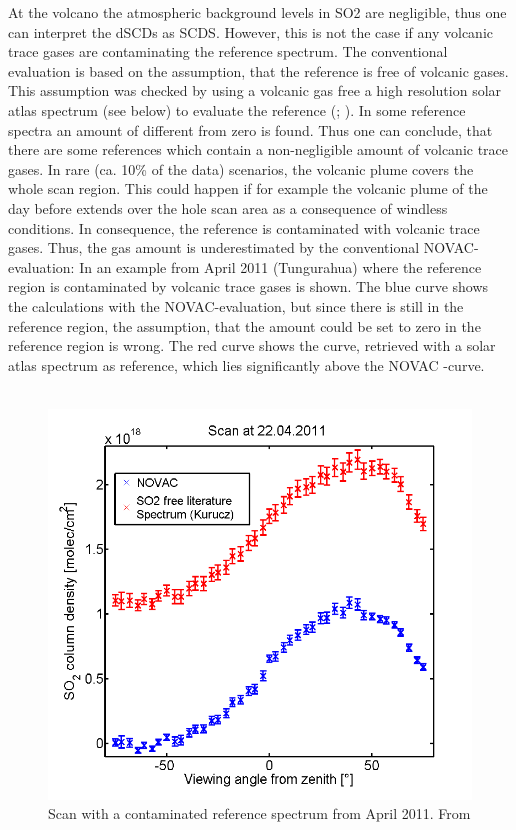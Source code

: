 At the volcano the atmospheric background levels in SO2 are negligible, thus one can interpret the dSCDs as SCDS. However, this is not the case if any volcanic trace gases are contaminating the reference spectrum.
The conventional evaluation is based on the assumption, that the reference is free of volcanic gases. This assumption was checked by using a volcanic gas free a high resolution solar atlas spectrum (see below) to evaluate the reference (\cite{lubcke2014optical}; \cite{salerno2009novel}). In some reference spectra an amount of   different from zero is found. Thus one can conclude, that there are some references which contain a non-negligible amount of volcanic trace gases.
In rare (ca. 10\% of the data) scenarios, the
volcanic plume covers the whole scan region.
This could happen if for example the volcanic plume of the day before extends over the hole scan area as a consequence of windless conditions.
In consequence, the reference	is contaminated with volcanic trace gases. Thus, the gas amount is underestimated by the conventional NOVAC-evaluation: In  an example from April 2011 (Tungurahua) where the reference region is contaminated by volcanic trace gases is shown. The blue  curve shows the calculations with the NOVAC-evaluation, but since there is still  in the reference region, the assumption, that the  amount could be set to zero in the reference region is wrong. The red curve shows the  curve, retrieved with a solar atlas spectrum as reference, which lies significantly above the NOVAC -curve.\\
\\	
%
\begin{figure}
	\centering
	\includegraphics[width=0.7\linewidth]{Bilder/contaminated}
	\caption{Scan with a contaminated reference spectrum from April 2011. From \cite{WarnachSimon}}
	\label{fig:contaminated}
\end{figure}
